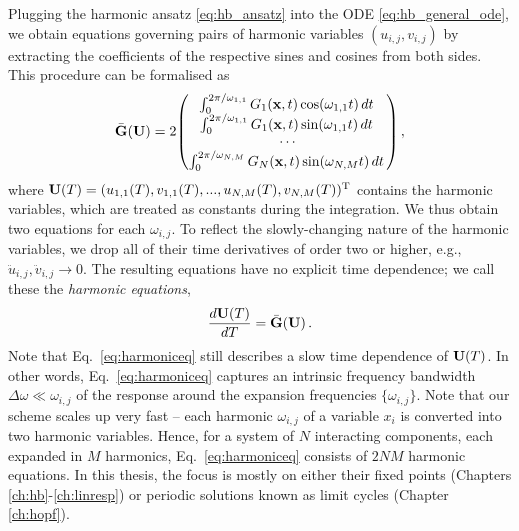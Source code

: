 Plugging the harmonic ansatz \eqref{eq:hb_ansatz} into the ODE \eqref{eq:hb_general_ode}, we obtain equations governing pairs of harmonic variables $(u_{i,j}, v_{i,j})$ by extracting the coefficients of the respective sines and cosines from both sides. This procedure can be formalised as
\begin{equation} \label{eq:hb_int2}
\bar{\vb{G}}(\vb{U}) = 2 \mqty( \int_0^{2\pi/\omega_{1,1}} G_1 ( \vb{x},t) \cos(\omega_{1,1} t) \,dt \,
\\  \int_0^{2\pi/\omega_{1,1}} G_1 ( \vb{x},t) \sin(\omega_{1,1} t)\, dt \,
\\ \cdots 
\\ \int_0^{2\pi/\omega_{N,M}} G_N ( \vb{x},t) \sin(\omega_{N,M} t)\, dt \,) \,,
\end{equation}
where $\vb{U}(T) = (u_{1,1}(T), v_{1,1}(T), ...,u_{N,M}(T), v_{N,M}(T))^{\text T}$ contains the harmonic variables, which are treated as constants during the integration.
We thus obtain two equations for each $\omega_{i,j}$. To reflect the slowly-changing nature of the harmonic variables, we drop all of their time derivatives of order two or higher, e.g., $\ddot{u}_{i,j}, \ddot{v}_{i,j}\rightarrow 0$. The resulting equations have no explicit time dependence; we call these the \textit{harmonic equations},
%
\begin{equation} \label{eq:harmoniceq}
\frac{d\vb{U}(T)}{dT}  = \bar{\vb{G}} (\vb{U})\,.
\end{equation}
%
Note that Eq.~\eqref{eq:harmoniceq} still describes a slow time dependence of $\vb{U}(T)$. In other words, Eq.~\eqref{eq:harmoniceq} captures an intrinsic frequency bandwidth $\Delta\omega \ll \omega_{i,j}$ of the response around the expansion frequencies $\{\omega_{i,j}\}$. Note that our scheme scales up very fast -- each harmonic $\omega_{i,j}$ of a variable $x_i$ is converted into two harmonic variables. Hence, for a system of $N$ interacting components, each expanded in $M$ harmonics, Eq.~\eqref{eq:harmoniceq} consists of $2 N M$ harmonic equations. In this thesis, the focus is mostly on either their fixed points (Chapters \ref{ch:hb}-\ref{ch:linresp}) or periodic solutions known as limit cycles (Chapter \ref{ch:hopf}). 

